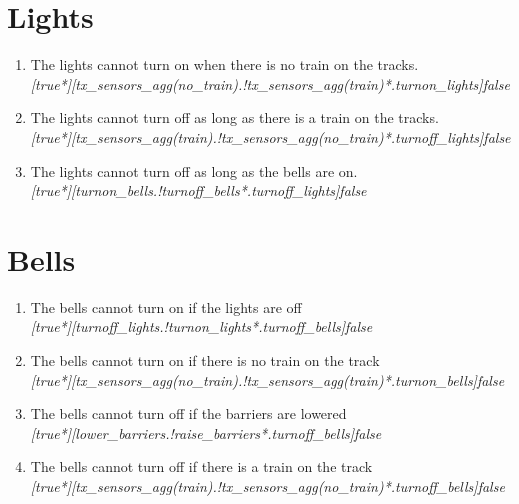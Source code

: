 \documentclass[final]{report}
\begin{document}
\section{Lights}

\begin{enumerate}
\item The lights cannot turn on when there is no train on the tracks.\\
\textit{[true*][tx\_sensors\_agg(no\_train).!tx\_sensors\_agg(train)*.turnon\_lights]false}

\item The lights cannot turn off as long as there is a train on the tracks.\\
\textit{[true*][tx\_sensors\_agg(train).!tx\_sensors\_agg(no\_train)*.turnoff\_lights]false}

\item The lights cannot turn off as long as the bells are on.\\
\textit{[true*][turnon\_bells.!turnoff\_bells*.turnoff\_lights]false}
\end{enumerate}

\section{Bells}
\begin{enumerate}
\item The bells cannot turn on if the lights are off\\
\textit{[true*][turnoff\_lights.!turnon\_lights*.turnoff\_bells]false}
\item The bells cannot turn on if there is no train on the track\\
\textit{[true*][tx\_sensors\_agg(no\_train).!tx\_sensors\_agg(train)*.turnon\_bells]false}
\item The bells cannot turn off if the barriers are lowered\\
\textit{[true*][lower\_barriers.!raise\_barriers*.turnoff\_bells]false}
\item The bells cannot turn off if there is a train on the track\\
\textit{[true*][tx\_sensors\_agg(train).!tx\_sensors\_agg(no\_train)*.turnoff\_bells]false}
\end{enumerate}
\end{document}
